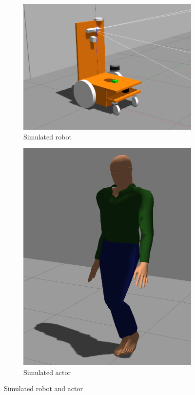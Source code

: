 \vspace{-10pt}

\begin{figure}[H]
  \centering
  \begin{subfigure}{0.40\textwidth}
    \centering
    \includegraphics[keepaspectratio, scale=0.15]{images/sim-robot.png}
    \caption{Simulated robot}
    \label{Fig:sim-robot}
  \end{subfigure}
  \begin{subfigure}{0.40\textwidth}
    \centering
    \includegraphics[keepaspectratio, scale=0.15]{images/sim-actor.png}
    \caption{Simulated actor}
    \label{Fig:sim-actor}
  \end{subfigure}
  \caption{Simulated robot and actor}
  \label{Fig:sim-robot-actor}
\end{figure}

